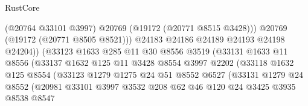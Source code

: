 \begin{lexlean}{RustCore}
\begin{coremodule}
                                      (@20764 @33101 @3997)
                                      @20769
                                      (@19172 (@20771 @8515 @3428)))
                                    @20769
                                    (@19172 (@20771 @8505 @8521)))
                                  @24183
                                  @24186
                                  @24189
                                  @24193
                                  @24198
                                  @24204))
                              (@33123
                                @1633
                                @285
                                @11
                                @30
                                @8556
                                @3519
                                (@33131
                                  @1633
                                  @11
                                  @8556
                                  (@33137
                                    @1632
                                    @125
                                    @11
                                    @3428
                                    @8554
                                    @3997
                                    @2202
                                    (@33118
                                      @1632
                                      @125
                                      @8554
                                      (@33123
                                        @1279
                                        @1275
                                        @24
                                        @51
                                        @8552
                                        @6527
                                        (@33131
                                          @1279
                                          @24
                                          @8552
                                          (@20981
                                            @33101
                                            @3997
                                            @3532
                                            @208
                                            @62
                                            @46
                                            @120
                                            @24
                                            @3425
                                            @3935
                                            @8538
                                            @8547

\end{coremodule}
\end{lexlean}

